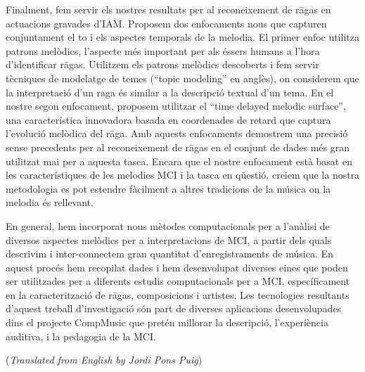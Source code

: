 Finalment, fem servir els nostres resultats per al reconeixement de rāgas en actuacions gravades d'IAM. Proposem dos enfocaments nous que capturen conjuntament el to i els aspectes temporals de la melodia. El primer enfoc utilitza patrons melòdics, l’aspecte més important per als éssers humans a l’hora d’identificar rāgas. Utilitzem els patrons melòdics descoberts i fem servir tècniques de modelatge de temes (“topic modeling” en anglès), on considerem que la interpretació d’un raga és similar a la descripció textual d’un tema. En el nostre segon enfocament, proposem utilitzar el “time delayed melodic surface”, una característica innovadora basada en coordenades de retard que captura l’evolució melòdica del rāga. Amb aquests enfocaments demostrem una precisió sense precedents per al reconeixement de rāgas en el conjunt de dades més gran utilitzat mai per a aquesta tasca. Encara que el nostre enfocament està basat en les característiques de les melodies MCI i la tasca en qüestió, creiem que la nostra metodologia es pot estendre fàcilment a altres tradicions de la música on la melodia és rellevant.

En general, hem incorporat nous mètodes computacionals per a l'anàlisi de diversos  aspectes melòdics per a interpretacions de MCI, a partir dels quals descrivim i inter-connectem gran quantitat d'enregistraments de música. En aquest procés hem recopilat dades i hem desenvolupat diverses eines que poden ser utilitzades per a diferents estudis computacionals per a MCI, específicament en la caracterització de rāgas, composicions i artistes. Les tecnologies resultants d'aquest treball d’investigació són part de diverses aplicacions desenvolupades dins el projecte CompMusic que pretén millorar la descripció, l’experiència auditiva, i la pedagogia de la MCI.

\vfill
{\noindent (\emph{Translated from English by Jordi Pons Puig})}
